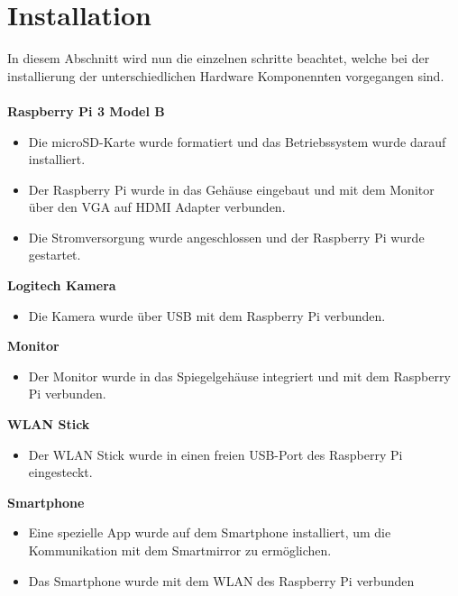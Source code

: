 \section{Installation}
In diesem Abschnitt wird nun die einzelnen schritte beachtet, welche bei der installierung der unterschiedlichen Hardware Komponennten vorgegangen sind. \\ \\
\noindent
\textbf{Raspberry Pi 3 Model B}
\begin{itemize}
    \item Die microSD-Karte wurde formatiert und das Betriebssystem wurde darauf installiert.
    \item Der Raspberry Pi wurde in das Gehäuse eingebaut und mit dem Monitor über den VGA auf HDMI Adapter verbunden.
    \item Die Stromversorgung wurde angeschlossen und der Raspberry Pi wurde gestartet.
\end{itemize}
\vspace{0.5cm}
\noindent\textbf{Logitech Kamera}
\begin{itemize}
    \item Die Kamera wurde über USB mit dem Raspberry Pi verbunden.
\end{itemize}
\vspace{0.5cm}
\noindent\textbf{Monitor}
\begin{itemize}
    \item Der Monitor wurde in das Spiegelgehäuse integriert und mit dem Raspberry Pi verbunden.
\end{itemize}
\vspace{0.5cm}
\noindent\textbf{WLAN Stick}
\begin{itemize}
    \item Der WLAN Stick wurde in einen freien USB-Port des Raspberry Pi eingesteckt.
\end{itemize}
\vspace{0.5cm}
\noindent\textbf{Smartphone}
\begin{itemize}
    \item Eine spezielle App wurde auf dem Smartphone installiert, um die Kommunikation mit dem Smartmirror zu ermöglichen.
    \item Das Smartphone wurde mit dem WLAN des Raspberry Pi verbunden
\end{itemize}

